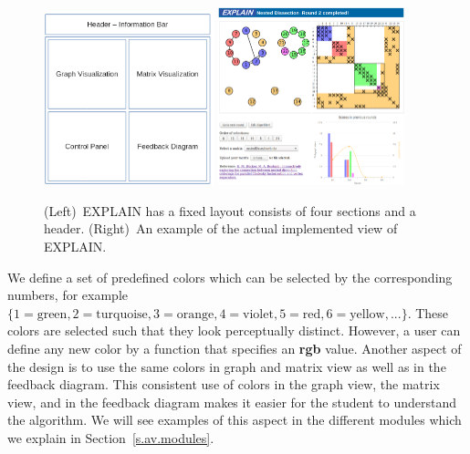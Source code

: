 \documentclass[12pt, twoside,a4paper,toc=bibliography]{scrbook}
\newcommand{\secref}[1]{Section~\protect\ref{#1}}
\begin{document}
\begin{figure}
\centering
\includegraphics[width=0.44\textwidth]{explain-vis.png}
\hfill
\includegraphics[width=0.48\textwidth]{explain2-init.png}
\caption{
(Left)~\mbox{EXPLAIN} has a fixed layout consists of four sections and a header.
(Right)~An example of the actual implemented view of \mbox{EXPLAIN}.}
\label{explain-design}
\end{figure}

We define a set of predefined colors which can be selected by
the corresponding numbers, for example
$\{1=\text{green}, 2=\text{turquoise}, 3=\text{orange}, 4=\text{violet},
5=\text{red}, 6=\text{yellow}, ...\}$.
These colors are selected such that they look perceptually distinct.
However, a user can define any new color by a function that specifies an \textbf{rgb} value.
Another aspect of the design is to use the same colors in graph and matrix view
as well as in the feedback diagram.
This consistent use of colors in the graph
view, the matrix view, and in the feedback diagram makes it easier for the student to understand
the algorithm. We will see examples of this aspect in the different modules
which we explain in \secref{s.av.modules}.
\end{document}
